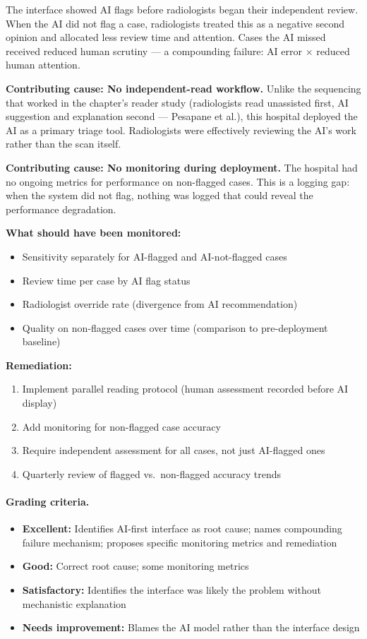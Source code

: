 The interface showed AI flags before radiologists began their independent review. When the AI did not flag a case, radiologists treated this as a negative second opinion and allocated less review time and attention. Cases the AI missed received reduced human scrutiny --- a compounding failure: AI error $\times$ reduced human attention.

\textbf{Contributing cause: No independent-read workflow.} Unlike the sequencing that worked in the chapter's reader study (radiologists read unassisted first, AI suggestion and explanation second --- Pesapane et al.), this hospital deployed the AI as a primary triage tool. Radiologists were effectively reviewing the AI's work rather than the scan itself.

\textbf{Contributing cause: No monitoring during deployment.} The hospital had no ongoing metrics for performance on non-flagged cases. This is a logging gap: when the system did not flag, nothing was logged that could reveal the performance degradation.

\textbf{What should have been monitored:}
\begin{itemize}
    \item Sensitivity separately for AI-flagged and AI-not-flagged cases
    \item Review time per case by AI flag status
    \item Radiologist override rate (divergence from AI recommendation)
    \item Quality on non-flagged cases over time (comparison to pre-deployment baseline)
\end{itemize}

\textbf{Remediation:}
\begin{enumerate}
    \item Implement parallel reading protocol (human assessment recorded before AI display)
    \item Add monitoring for non-flagged case accuracy
    \item Require independent assessment for all cases, not just AI-flagged ones
    \item Quarterly review of flagged vs.\ non-flagged accuracy trends
\end{enumerate}

\paragraph{Grading criteria.}
\begin{itemize}
    \item \textbf{Excellent:} Identifies AI-first interface as root cause; names compounding failure mechanism; proposes specific monitoring metrics and remediation
    \item \textbf{Good:} Correct root cause; some monitoring metrics
    \item \textbf{Satisfactory:} Identifies the interface was likely the problem without mechanistic explanation
    \item \textbf{Needs improvement:} Blames the AI model rather than the interface design
\end{itemize}

